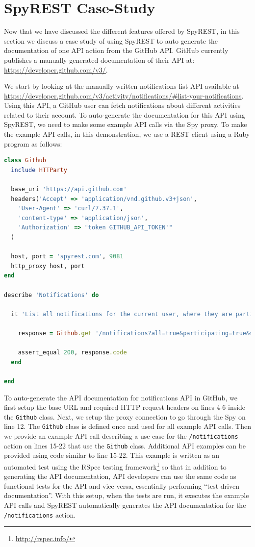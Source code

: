 \documentclass[conference]{IEEEtran}
\begin{document}
\section{SpyREST Case-Study}
Now that we have discussed the different features offered by SpyREST, in this section we discuss a case study of using SpyREST to auto generate the documentation of one API action from the GitHub API. GitHub currently publishes a manually generated documentation of their API at: \url{https://developer.github.com/v3/}.

We start by looking at the manually written notifications list API available at \url{https://developer.github.com/v3/activity/notifications/#list-your-notifications}. Using this API, a GitHub user can fetch notifications about different activities related to their account. To auto-generate the documentation for this API using SpyREST, we need to make some example API calls via the Spy proxy. To make the example API calls, in this demonstration, we use a REST client using a Ruby program as follows:

\lstset{showstringspaces=false, basicstyle=\footnotesize, numbers=left, numbersep=1pt }
\begin{lstlisting}[language=ruby, breaklines=true, caption={}, label=list:ex]
class Github
  include HTTParty

  base_uri 'https://api.github.com'
  headers('Accept' => 'application/vnd.github.v3+json',
    'User-Agent' => 'curl/7.37.1',
    'content-type' => 'application/json',
    'Authorization' => "token GITHUB_API_TOKEN'"
  )

  host, port = 'spyrest.com', 9081
  http_proxy host, port
end

describe 'Notifications' do

  it 'List all notifications for the current user, where they are participating, since a time' do

    response = Github.get '/notifications?all=true&participating=true&since=2014-01-01T00:00:00Z'

    assert_equal 200, response.code
  end

end\end{lstlisting}

To auto-generate the API documentation for notifications API in GitHub, we first setup the base URL and required HTTP request headers on lines 4-6 inside the \texttt{Github} class. Next, we setup the proxy connection to go through the Spy on line 12. The \texttt{Github} class is defined once and used for all example API calls. Then we provide an example API call describing a use case for the \texttt{/notifications} action on lines 15-22 that use the \texttt{Github} class. Additional API examples can be provided using code similar to line 15-22. This example is written as an automated test using the RSpec testing framework\footnote{\url{http://rspec.info/}} so that in addition to generating the API documentation, API developers can use the same code as functional tests for the API and vice versa, essentially performing ``test driven documentation''. With this setup, when the tests are run, it executes the example API calls and SpyREST automatically generates the API documentation for the \texttt{/notifications} action.
\end{document}

